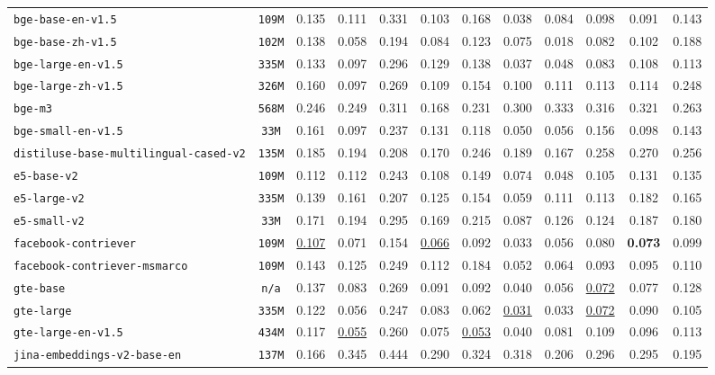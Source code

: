 \documentclass{article}
\begin{document}
\begin{table}[htbp]
{\begin{tabular}{lccccccccccc}
\texttt{bge-base-en-v1.5} & \texttt{109M} & 0.135 & 0.111 & 0.331 & 0.103 & 0.168 & 0.038 & 0.084 & 0.098 & 0.091 & 0.143 \\
\texttt{bge-base-zh-v1.5} & \texttt{102M} & 0.138 & 0.058 & 0.194 & 0.084 & 0.123 & 0.075 & 0.018 & 0.082 & 0.102 & 0.188 \\
\texttt{bge-large-en-v1.5} & \texttt{335M} & 0.133 & 0.097 & 0.296 & 0.129 & 0.138 & 0.037 & 0.048 & 0.083 & 0.108 & 0.113 \\
\texttt{bge-large-zh-v1.5} & \texttt{326M} & 0.160 & 0.097 & 0.269 & 0.109 & 0.154 & 0.100 & 0.111 & 0.113 & 0.114 & 0.248 \\
\texttt{bge-m3} & \texttt{568M} & 0.246 & 0.249 & 0.311 & 0.168 & 0.231 & 0.300 & 0.333 & 0.316 & 0.321 & 0.263 \\
\texttt{bge-small-en-v1.5} & \texttt{33M} & 0.161 & 0.097 & 0.237 & 0.131 & 0.118 & 0.050 & 0.056 & 0.156 & 0.098 & 0.143 \\
\texttt{distiluse-base-multilingual-cased-v2} & \texttt{135M} & 0.185 & 0.194 & 0.208 & 0.170 & 0.246 & 0.189 & 0.167 & 0.258 & 0.270 & 0.256 \\
\texttt{e5-base-v2} & \texttt{109M} & 0.112 & 0.112 & 0.243 & 0.108 & 0.149 & 0.074 & 0.048 & 0.105 & 0.131 & 0.135 \\
\texttt{e5-large-v2} & \texttt{335M} & 0.139 & 0.161 & 0.207 & 0.125 & 0.154 & 0.059 & 0.111 & 0.113 & 0.182 & 0.165 \\
\texttt{e5-small-v2} & \texttt{33M} & 0.171 & 0.194 & 0.295 & 0.169 & 0.215 & 0.087 & 0.126 & 0.124 & 0.187 & 0.180 \\
\texttt{facebook-contriever} & \texttt{109M} & \underline{0.107} & 0.071 & 0.154 & \underline{0.066} & 0.092 & 0.033 & 0.056 & 0.080 & \textbf{0.073} & 0.099 \\
\texttt{facebook-contriever-msmarco} & \texttt{109M} & 0.143 & 0.125 & 0.249 & 0.112 & 0.184 & 0.052 & 0.064 & 0.093 & 0.095 & 0.110 \\
\texttt{gte-base} & \texttt{n/a} & 0.137 & 0.083 & 0.269 & 0.091 & 0.092 & 0.040 & 0.056 & \underline{0.072} & 0.077 & 0.128 \\
\texttt{gte-large} & \texttt{335M} & 0.122 & 0.056 & 0.247 & 0.083 & 0.062 & \underline{0.031} & 0.033 & \underline{0.072} & 0.090 & 0.105 \\
\texttt{gte-large-en-v1.5} & \texttt{434M} & 0.117 & \underline{0.055} & 0.260 & 0.075 & \underline{0.053} & 0.040 & 0.081 & 0.109 & 0.096 & 0.113 \\
\texttt{jina-embeddings-v2-base-en} & \texttt{137M} & 0.166 & 0.345 & 0.444 & 0.290 & 0.324 & 0.318 & 0.206 & 0.296 & 0.295 & 0.195 \\

\end{tabular}}
\end{table}
\end{document}
